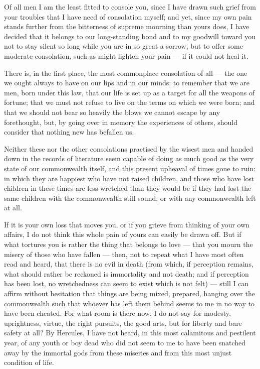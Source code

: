 

 Of all men I am the least fitted to console you, since I have drawn such grief from your troubles that I have need of consolation myself; and yet, since my own pain stands further from the bitterness of supreme mourning than yours does, I have decided that it belongs to our long-standing bond and to my goodwill toward you not to stay silent so long while you are in so great a sorrow, but to offer some moderate consolation, such as might lighten your pain --- if it could not heal it.

 There is, in the first place, the most commonplace consolation of all --- the one we ought always to have on our lips and in our minds: to remember that we are men, born under this law, that our life is set up as a target for all the weapons of fortune; that we must not refuse to live on the terms on which we were born; and that we should not bear so heavily the blows we cannot escape by any forethought, but, by going over in memory the experiences of others, should consider that nothing new has befallen us.

 Neither these nor the other consolations practised by the wisest men and handed down in the records of literature seem capable of doing as much good as the very state of our commonwealth itself, and this present upheaval of times gone to ruin: in which they are happiest who have not raised children, and those who have lost children in these times are less wretched than they would be if they had lost the same children with the commonwealth still sound, or with any commonwealth left at all.

 If it is your own loss that moves you, or if you grieve from thinking of your own affairs, I do not think this whole pain of yours can easily be drawn off. But if what tortures you is rather the thing that belongs to love --- that you mourn the misery of those who have fallen --- then, not to repeat what I have most often read and heard, that there is no evil in death (from which, if perception remains, what should rather be reckoned is immortality and not death; and if perception has been lost, no wretchedness can seem to exist which is not felt) --- still I can affirm without hesitation that things are being mixed, prepared, hanging over the commonwealth such that whoever has left them behind seems to me in no way to have been cheated. For what room is there now, I do not say for modesty, uprightness, virtue, the right pursuits, the good arts, but for liberty and bare safety at all? By Hercules, I have not heard, in this most calamitous and pestilent year, of any youth or boy dead who did not seem to me to have been snatched away by the immortal gods from these miseries and from this most unjust condition of life.

